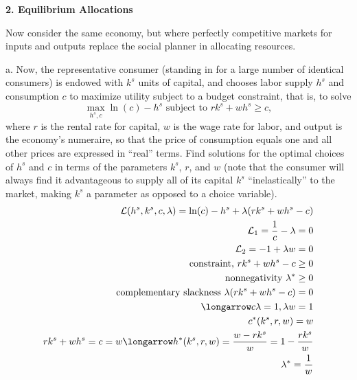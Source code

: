 \documentclass[12pt]{article}
\begin{document}
{\bfseries 2. Equilibrium Allocations}

Now consider the same economy, but where perfectly competitive markets for inputs and outputs replace the social planner in allocating resources. 
\begin{description}
\item a. Now, the representative consumer (standing in for a large number of identical consumers) is endowed with $k^{s}$ units of capital, and chooses labor supply $h^{s}$ and consumption $c$ to maximize utility subject to a budget constraint, that is, to solve
$$
\max_{h^{s},c} \ln(c)-h^{s} \text{ subject to } rk^{s} + wh^{s} \geq c,
$$
where $r$ is the rental rate for capital, $w$ is the wage rate for labor, and output is the economy's numeraire, so that the price of consumption equals one and all other prices are expressed in ``real'' terms. Find solutions for the optimal choices of $h^{s}$ and $c$ in terms of the parameters $k^{s}$, $r$, and $w$ (note that the consumer will always find it advantageous to supply all of its capital $k^{s}$ ``inelastically'' to the market, making $k^{s}$ a parameter as opposed to a choice variable).
\begin{align*}
\mathcal{L}(h^s, k^s, c, \lambda) = \ln(c) - h^s + \lambda(rk^s+wh^s-c)   \\ 
\mathcal{L}_1 = \frac{1}{c} - \lambda = 0   \\ 
\mathcal{L}_2 = -1 + \lambda w = 0   \\ 
\text{ constraint, } rk^s+wh^s - c \geq 0   \\ 
\text{ nonnegativity } \lambda^* \geq 0   \\
\text{ complementary slackness } \lambda(rk^s + wh^s - c) = 0  \\ 
\longarrow c\lambda = 1 , \lambda w = 1    \\ 
c^*(k^s, r, w) = w    \\ 
rk^s + wh^s = c = w  \longarrow  h^*(k^s, r, w) = \frac{w - rk^s}{w} = 1 - \frac{rk^s}{w}   \\ 
\lambda^* = \frac{1}{w} 
\end{align*}


\end{description}
\end{document}
